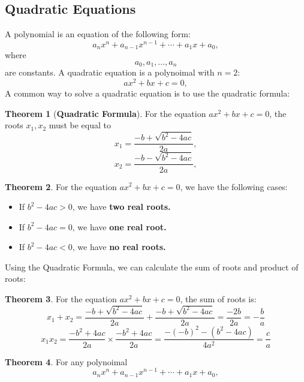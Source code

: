 \documentclass[a4paper]{article}
\theoremstyle{definition}
\newtheorem{theorem}{Theorem}
\begin{document}
\subsection{Quadratic Equations}
A polynomial is an equation of the following form:
\[
    a_n x^n + a_{n-1} x^{n-1} + \cdots + a_1 x + a_0 ,
\]
where
\[
    a_0, a_1, \dots, a_n
\]
are constants. A quadratic equation is a polynoimal with \(n = 2\):
\[
    ax^2 + bx + c = 0,
\]
A common way to solve a quadratic equation is to use the quadratic formula:
\begin{theorem}[\textbf{Quadratic Formula}]
    For the equation \(ax^2 + bx + c = 0\), the roots \(x_1, x_2 \) must be equal to
    \[
        x_1 = \dfrac{-b + \sqrt{b^2 - 4ac}}{2a},
    \]
    \[
        x_2 = \dfrac{-b - \sqrt{b^2 - 4ac}}{2a},
    \]
\end{theorem}
\begin{theorem}
    For the equation \(ax^2 + bx + c = 0\), we have the following cases:
    \begin{itemize}
        \item If \(b^2 - 4ac > 0\), we have \textbf{two real roots.}
        \item If \(b^2 - 4ac = 0\), we have \textbf{one real root.}
        \item If \(b^2 - 4ac < 0\), we have \textbf{no real roots.}
    \end{itemize}
    Using the Quadratic Formula, we can calculate the sum of roots and product of roots:
\end{theorem}
\begin{theorem}
    For the equation \(ax^2 + bx + c = 0\), the sum of roots is:
    \begin{displaymath}
        x_1 + x_2 = \dfrac{-b + \sqrt{b^2 - 4ac}}{2a} + \dfrac{-b + \sqrt{b^2 - 4ac}}{2a}
        = \dfrac{-2b}{2a} = - \dfrac{b}{a}
    \end{displaymath}
    \begin{displaymath}
        x_1x_2 = \dfrac{-b^2 + 4ac}{2a} \times \dfrac{-b^2 + 4ac}{2a} =
        \dfrac{-(-b)^2 - (b^2 - 4ac)}{4a^2} = \dfrac{c}{a}
    \end{displaymath}
\end{theorem}
\begin{theorem}
    For any polynoimal
    \[
        a_n x^n + a_{n-1} x^{n-1} + \cdots + a_1 x + a_0 ,
    \]
    \begin{displaymath}

    \end{displaymath}

\end{theorem}
\end{document}

